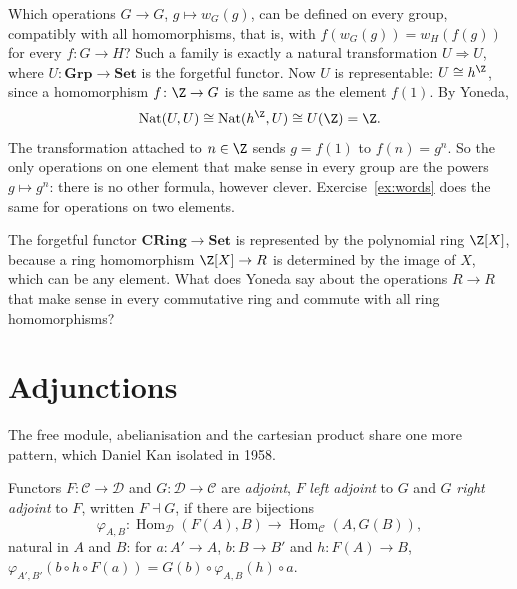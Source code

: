 \begin{example}\label{ex:natops}
Which operations $G\to G$, $g\mapsto w_G(g)$, can be defined on every group, compatibly with all homomorphisms, that is, with $f(w_G(g))=w_H(f(g))$ for every $f\colon G\to H$? Such a family is exactly a natural
transformation $U\Rightarrow U$, where $U\colon\mathbf{Grp}\to\mathbf{Set}$ is the forgetful functor. Now $U$ is representable: $U\cong h^{\Z}$, since a homomorphism $f\colon\Z\to G$ is the same as the element $f(1)$. By Yoneda,
\[\operatorname{Nat}(U,U)\cong\operatorname{Nat}(h^{\Z},U)\cong U(\Z)=\Z.\]
The transformation attached to $n\in\Z$ sends $g=f(1)$ to $f(n)=g^n$. So the only operations on one element that make sense in every group are the powers $g\mapsto g^n$: there is no other formula, however
clever. Exercise~\ref{ex:words} does the same for operations on two elements.
\end{example}

\begin{think}
The forgetful functor $\mathbf{CRing}\to\mathbf{Set}$ is represented by the polynomial ring $\Z[X]$, because a ring homomorphism $\Z[X]\to R$ is determined by the image of $X$, which can be any element. What does Yoneda
say about the operations $R\to R$ that make sense in every commutative ring and commute with all ring homomorphisms?
\end{think}

\section{Adjunctions}

The free module, abelianisation and the cartesian product share one more pattern, which Daniel Kan isolated in 1958.

\begin{definition}\label{def:adjunction}
Functors $F\colon\mathcal C\to\mathcal D$ and $G\colon\mathcal D\to\mathcal C$ are \emph{adjoint}, $F$ \emph{left adjoint} to $G$ and $G$ \emph{right adjoint} to $F$, written $F\dashv G$, if there are bijections
\[\varphi_{A,B}\colon\operatorname{Hom}_{\mathcal D}(F(A),B)\to\operatorname{Hom}_{\mathcal C}(A,G(B)),\]
natural in $A$ and $B$: for $a\colon A'\to A$, $b\colon B\to B'$ and $h\colon F(A)\to B$, $\varphi_{A',B'}(b\circ h\circ F(a))=G(b)\circ\varphi_{A,B}(h)\circ a$.
\end{definition}

